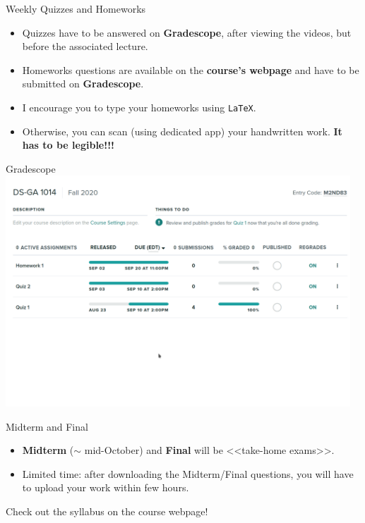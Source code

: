 \documentclass{beamer}
\begin{document}
\begin{frame}[t]{Weekly Quizzes and Homeworks}
	\begin{itemize}
		\item Quizzes have to be answered on \textbf{Gradescope}, after viewing the videos, but before the associated lecture.
			\vspace{0.3cm}
		\item Homeworks questions are available on the \textbf{course's webpage} and have to be submitted on \textbf{Gradescope}.
			\vspace{0.3cm}
			\pause
		\item I encourage you to type your homeworks using \texttt{LaTeX}.
			\vspace{0.3cm}
		\item Otherwise, you can scan (using dedicated app) your handwritten work.
			{\bf It has to be legible!!!}
	\end{itemize}
\end{frame}
\begin{frame}{Gradescope}
	\hspace*{-1.2cm}
	\includegraphics[width=12.9cm]{gradescope.png}
\end{frame}

\begin{frame}{Midterm and Final}
	\begin{itemize}
		\item {\bf Midterm} ($\sim$ mid-October) and {\bf Final} will be <<take-home exams>>.
			\vspace{0.3cm}
		\item Limited time: after downloading the Midterm/Final questions, you will have to upload your work within few hours.
	\end{itemize}
	\vspace{0.6cm}
	\begin{center}
		Check out the syllabus on the course webpage!
	\end{center}
\end{frame}
\end{document}
